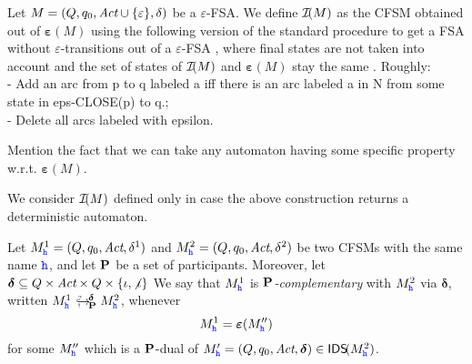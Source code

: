 \begin{definition}
Let $M=(Q,q_0,\textit{Act}\cup\{\varepsilon\},\delta)$ be a $\varepsilon$-FSA.
We define $\mathcal{I}\!(M)$ as the CFSM obtained out of $\bm{\varepsilon}(M)$ 
using the following version of the standard procedure to get a FSA without $\varepsilon$-transitions
out of a $\varepsilon$-FSA \cite{sipser96}, where final states are not taken into account and
the set of states of $\mathcal{I}\!(M)$ and $\bm{\varepsilon}(M)$ stay the same . 
Roughly:\\ 
- Add an arc from p to q labeled a iff there is an arc labeled a in N from some state in eps-CLOSE(p) to q.;\\
- Delete all arcs labeled with epsilon.
\end{definition}
Mention the fact that we can take any automaton having some specific property w.r.t. $\bm{\varepsilon}(M)$.

We consider $\mathcal{I}\!(M)$ defined only in case the above construction returns a deterministic automaton.
 

\begin{definition}
Let $M^1_{\mathtt{\color{blue}{ {h}}}} = (Q, q_0, \textit{Act}, \delta^1)$ and 
$M^2_{\mathtt{\color{blue}{ {h}}}} = (Q, q_0, \textit{Act}, \delta^2)$  
be two CFSMs with the same name ${\mathtt{\color{blue}{ {h}}}}$, and let $\mathbf{P}$ be a set of participants.
Moreover, let $\bm{\delta} \subseteq Q\times\textit{Act}\times Q \times \{\iota,\not\iota\}$
We say that
$M^1_{\mathtt{\color{blue}{ {h}}}}$ is {\em $\mathbf{P}$-complementary} with $M^2_{\mathtt{\color{blue}{ {h}}}}$ via $\bm{\delta}$, written $M^1_{\mathtt{\color{blue}{ {h}}}}\ \,{^{\mbox{\tiny $?$}}_{\mbox{\tiny $!$}}\hspace{-8pt}\hookrightarrow_{\!\mathbf{P}\,\,}^{\!\bm{\delta}\,\,}}M^2_{\mathtt{\color{blue}{ {h}}}}$, whenever 
$$M^1_{\mathtt{\color{blue}{ {h}}}} = \bm{\varepsilon}(M''_{\mathtt{\color{blue}{ {h}}}})$$
for some $M''_{\mathtt{\color{blue}{ {h}}}}$ which is a $\mathbf{P}$-dual of $M'_{\mathtt{\color{blue}{ {h}}}}= (Q, q_0, \textit{Act}, \bm{\delta})\in\mathsf{IDS}\!(M^2_{\mathtt{\color{blue}{ {h}}}})$.
\end{definition}


